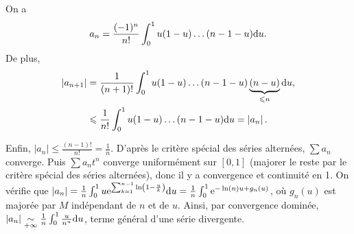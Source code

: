 \documentclass[12pt]{article}
\begin{document}
\begin{remark}
    On a 
    \begin{equation}
        a_n=\frac{(-1)^{n}}{n!}\int_{0}^{1}u(1-u)\dots(n-1-u)\mathrm{d} u.
    \end{equation}
    De plus,
    \begin{align}
        \left\lvert a_{n+1}\right\rvert
        &=\frac{1}{(n+1)!}\int_{0}^{1}u(1-u)\dots(n-1-u)\underbrace{(n-u)}_{\leqslant n}\mathrm{d} u,\\
        &\leqslant \frac{1}{n!}\int_{0}^{1}u(1-u)\dots(n-1-u)\mathrm{d} u=\left\lvert a_n\right\rvert.
    \end{align}

    Enfin, $\left\lvert a_n\right\rvert\leqslant\frac{(n-1)!}{n!}=\frac{1}{n}$. D'après le critère spécial des séries alternées, $\sum a_{n}$ converge. Puis $\sum a_{n}t^{n}$ converge uniformément sur $[0,1]$ (majorer le reste par le critère spécial des séries alternées), donc il y a convergence et continuité en 1. On vérifie que $\left\lvert a_n\right\rvert=\frac{1}{n}\int_{0}^{1}u\mathrm{e}^{\sum_{k=1}^{n-1}\ln\left(1-\frac{u}{k}\right)}\mathrm{d} u=\frac{1}{n}\int_{0}^{1}\mathrm{e}^{-\ln(n)u+g_n(u)}$, où $g_n(u)$ est majorée par $M$ indépendant de $n$ et de $u$. Ainsi, par convergence dominée, $\left\lvert a_n\right\rvert\underset{+\infty}{\sim}\frac{1}{n}\int_{0}^{1}\frac{u}{n^{u}}\mathrm{d} u$, terme général d'une série divergente.
\end{remark}
\end{document}
